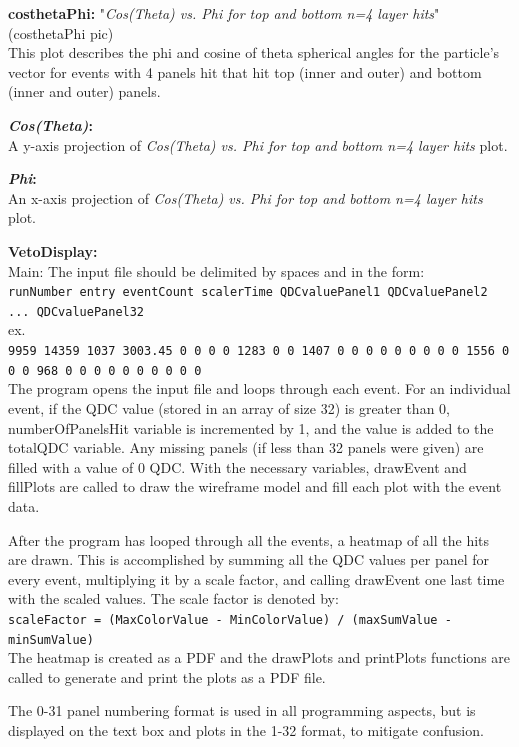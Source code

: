 \documentclass[a4paper,12pt]{article}
\begin{document}
\textbf{costhetaPhi:} "\emph{Cos(Theta) vs. Phi for top and bottom n=4 layer hits}" \\
(costhetaPhi pic) \\
This plot describes the phi and cosine of theta spherical angles for the particle's vector for events with 4 panels hit that hit top (inner and outer) and bottom (inner and outer) panels. 

\textbf{\emph{Cos(Theta)}:} \\
A y-axis projection of \emph{Cos(Theta) vs. Phi for top and bottom n=4 layer hits} plot.

\textbf{\emph{Phi}:} \\
An x-axis projection of \emph{Cos(Theta) vs. Phi for top and bottom n=4 layer hits} plot.

\pagebreak

\textbf{VetoDisplay:} \\
Main:
The input file should be delimited by spaces and in the form: \\
\texttt{runNumber entry eventCount scalerTime QDCvaluePanel1 QDCvaluePanel2 ... QDCvaluePanel32} \\
ex. \\
\texttt{9959 14359 1037 3003.45 0 0 0 0 1283 0 0 1407 0 0 0 0 0 0 0 0 0 1556 0 0 0 968 0 0 0 0 0 0 0 0 0 0 } \\
The program opens the input file and loops through each event. For an individual event, if the QDC value (stored in an array of size 32) is greater than 0, numberOfPanelsHit variable is incremented by 1, and the value is added to the totalQDC variable. Any missing panels (if less than 32 panels were given) are filled with a value of 0 QDC. With the necessary variables, drawEvent and fillPlots are called to draw the wireframe model and fill each plot with the event data. 

After the program has looped through all the events, a heatmap of all the hits are drawn. This is accomplished by summing all the QDC values per panel for every event, multiplying it by a scale factor, and calling drawEvent one last time with the scaled values. The scale factor is denoted by: \\
\texttt{scaleFactor = (MaxColorValue - MinColorValue) / (maxSumValue - minSumValue)} \\
The heatmap is created as a PDF and the drawPlots and printPlots functions are called to generate and print the plots as a PDF file.

The 0-31 panel numbering format is used in all programming aspects, but is displayed on the text box and plots in the 1-32 format, to mitigate confusion.
\end{document}
